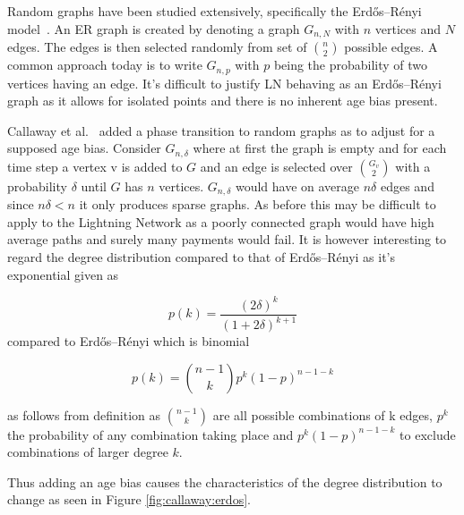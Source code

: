 Random graphs have been studied extensively, specifically the Erdős–Rényi model~\cite{erdos:renyi:random:graphs}. An ER graph is created by denoting a graph $G_{n,N}$ with $n$ vertices and $N$ edges. The edges is then selected randomly from set of ${n \choose 2}$ possible edges. A common approach today is to write $G_{n,p}$ with $p$ being the probability of two vertices having an edge. It's difficult to justify LN behaving as an Erdős–Rényi graph as it allows for isolated points and there is no inherent age bias present. 

Callaway et al.~\cite{callaway:hopcraft:randomly:grown:graphs} added a phase transition to random graphs as to adjust for a supposed age bias. Consider $G_{n,\delta}$ where at first the graph is empty and for each time step a vertex v is added to $G$ and an edge is selected over $G_v \choose 2$ with a probability $\delta$ until $G$ has $n$ vertices. $G_{n,\delta}$ would have on average $n\delta$ edges and since $n\delta < n$ it only produces sparse graphs. As before this may be difficult to apply to the Lightning Network as a poorly connected graph would have high average paths and surely many payments would fail. It is however interesting to regard the \gls{degree distribution} compared to that of Erdős–Rényi as it's exponential given as

\begin{equation}
	p(k) = \dfrac{(2\delta)^k}{(1 + 2\delta)^{k+1}} 
	\label{eq:callaway}
\end{equation}
compared to Erdős–Rényi which is binomial

\begin{equation}
	p(k) = {n-1 \choose k} p^k(1-p)^{n-1-k} 
	\label{eq:erdos:renyi}
\end{equation}

as follows from definition as ${n-1 \choose k}$ are all possible combinations of k edges,  $p^k$ the probability of any combination taking place and $p^k(1-p)^{n-1-k}$ to exclude combinations of larger degree $k$.

Thus adding an age bias causes the characteristics of the \gls{degree distribution} to change as seen in Figure \ref{fig:callaway:erdos}.

